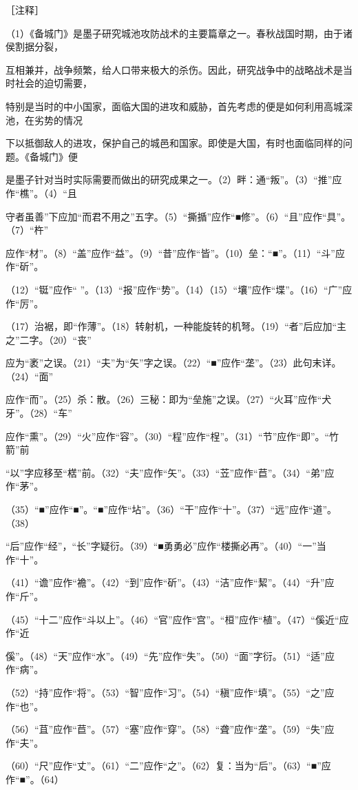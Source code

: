 \documentclass[12pt,UTF8]{ctexbook}
\begin{document}
［注释］ 

（1）《备城门》是墨子研究城池攻防战术的主要篇章之一。春秋战国时期，由于诸侯割据分裂， 

互相兼并，战争频繁，给人口带来极大的杀伤。因此，研究战争中的战略战术是当时社会的迫切需要， 

特别是当时的中小国家，面临大国的进攻和威胁，首先考虑的便是如何利用高城深池，在劣势的情况 

下以抵御敌人的进攻，保护自己的城邑和国家。即使是大国，有时也面临同样的问题。《备城门》便 

是墨子针对当时实际需要而做出的研究成果之一。（2）畔：通“叛”。（3）“推”应作“樵”。（4）“且 

守者虽善”下应加“而君不用之”五字。（5）“撕揗”应作“■修”。（6）“且”应作“具”。（7）“杵” 

应作“材”。（8）“盖”应作“益”。（9）“昔”应作“皆”。（10）垒：“■”。（11）“斗”应作“斫”。 

（12）“铤”应作“ ”。（13）“报”应作“势”。（14）（15）“壤”应作“堞”。（16）“广”应作“厉”。 

（17）治裾，即“作薄”。（18）转射机，一种能旋转的机弩。（19）“者”后应加“主之”二字。（20）“丧” 

应为“袤”之误。（21）“夫”为“矢”字之误。（22）“■”应作“垄”。（23）此句末详。（24）“面” 

应作“而”。（25）杀：散。（26）三秘：即为“垒施”之误。（27）“火耳”应作“犬牙”。（28）“车” 

应作“熏”。（29）“火”应作“容”。（30）“程”应作“桯”。（31）“节”应作“即”。“竹箭”前 

“以”字应移至“楛”前。（32）“夫”应作“矢”。（33）“苙”应作“苣”。（34）“弟”应作“茅”。 

（35）“■”应作“■”。“■”应作“坫”。（36）“干”应作“十”。（37）“远”应作“道”。（38） 

“后”应作“经”，“长”字疑衍。（39）“■勇勇必”应作“楼撕必再”。（40）“一”当作“十”。 

（41）“谵”应作“襜”。（42）“到”应作“斫”。（43）“洁”应作“絜”。（44）“升”应作“斤”。 

（45）“十二”应作“斗以上”。（46）“官”应作“宫”。“桓”应作“植”。（47）“傒近“应作“近 

傒”。（48）“天”应作“水”。（49）“先”应作“失”。（50）“面”字衍。（51）“适”应作“病”。 

（52）“持”应作“将”。（53）“智”应作“习”。（54）“稹”应作“填”。（55）“之”应作“也”。 

（56）“苴”应作“苣”。（57）“塞”应作“穿”。（58）“聋”应作“垄”。（59）“失”应作“夫”。 

（60）“尺”应作“丈”。（61）“二”应作“之”。（62）复：当为“后”。（63）“■”应作“■”。（64） 
\end{document}
